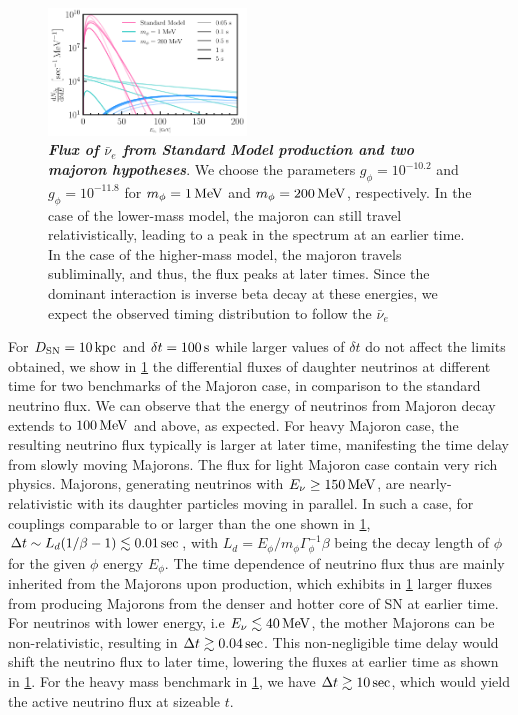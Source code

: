 \begin{figure}[t!]
    \centering
    \includegraphics[width=0.47\textwidth]{figures/majoran_fluxes.pdf}
    \caption{\textit{\textbf{Flux of $\bar{\nu}_{e}$ from Standard Model production and two majoron hypotheses}}.
    We choose the parameters $g_\phi = 10^{-10.2}$ and $g_\phi = 10^{-11.8}$ for $m_\phi = \unit[1]{MeV}$ and $m_\phi = \unit[200]{MeV}$, respectively.
    In the case of the lower-mass model, the majoron can still travel relativistically, leading to a peak in the spectrum at an earlier time.
    In the case of the higher-mass model, the majoron travels subliminally, and thus, the flux peaks at later times.
    Since the dominant interaction is inverse beta decay at these energies, we expect the observed timing distribution to follow the $\bar{\nu}_{e}$
    }
    \label{fig:fluxes}
\end{figure}

For $D_{\rm SN} = \unit[10]{kpc}$ and $\delta t = \unit[100]{s}$ while larger values of $\delta t$ do not affect the limits obtained, we show in \cref{fig:fluxes} the differential fluxes of daughter neutrinos at different time for two benchmarks of the Majoron case, in comparison to the standard neutrino flux.
We can observe that the energy of neutrinos from Majoron decay extends to $\unit[100]{MeV}$ and above, as expected. For heavy Majoron case, the resulting neutrino flux typically is larger at later time, manifesting the time delay from slowly moving Majorons. 
The flux for light Majoron case contain very rich physics. Majorons, generating neutrinos with $E_\nu \geq \unit[150]{MeV}$, are nearly-relativistic with its daughter particles moving in parallel. In such a case, for couplings comparable to or larger than the one shown in \cref{fig:fluxes}, $\Delta t \sim L_d (1/\beta -1)\lesssim \unit[0.01]{sec}$, with $L_d = E_\phi/m_\phi \Gamma^{-1}_\phi \beta$ being the decay length of $\phi$ for the given $\phi$ energy $E_\phi$. The time dependence of neutrino flux thus are mainly inherited from the Majorons upon production, which exhibits in \cref{fig:fluxes} larger fluxes from producing Majorons from the denser and hotter core of SN at earlier time.
For neutrinos with lower energy, i.e $E_\nu \lesssim \unit[40]{MeV}$, the mother Majorons can be non-relativistic, resulting in $\Delta t \gtrsim \unit[0.04]{sec}$. This non-negligible time delay would shift the neutrino flux to later time, lowering the fluxes at earlier time as shown in \cref{fig:fluxes}. For the heavy mass benchmark in \cref{fig:fluxes}, we have $\Delta t \gtrsim \unit[10]{sec}$, which would yield the active neutrino flux at sizeable $t$.

